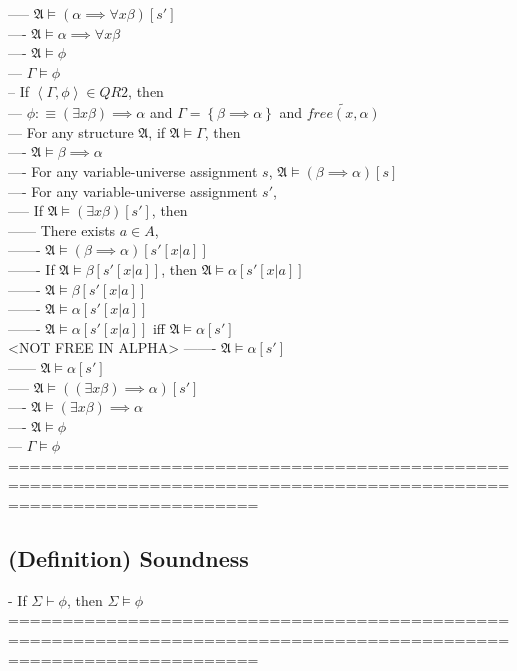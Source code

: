 \documentclass{book}
\newcommand{\is}{:\equiv}
\newcommand{\pnot}[1]{\widetilde{#1}}
\newcommand{\free}[2]{free(#1, #2)}
\newcommand{\set}[1]{\left\{ #1 \right\}}
\newcommand{\seq}[1]{\left\langle #1 \right\rangle}
\begin{document}
					----- $\mathfrak{A} \vDash (\alpha \implies \forall x \beta)[s']$ \\
				---- $\mathfrak{A} \vDash \alpha \implies \forall x \beta$ \\
				---- $\mathfrak{A} \vDash \phi$ \\
			--- $\Gamma \vDash \phi$ \\
		-- If $\seq{\Gamma, \phi} \in QR2$, then \\
			--- $\phi \is (\exists x \beta) \implies \alpha$ and $\Gamma = \set{\beta \implies \alpha}$ and $\pnot{\free{x}{\alpha}}$ \\
			--- For any structure $\mathfrak{A}$, if $\mathfrak{A} \vDash \Gamma$, then \\
				---- $\mathfrak{A} \vDash \beta \implies \alpha$ \\
				---- For any variable-universe assignment $s$, $\mathfrak{A} \vDash (\beta \implies \alpha)[s]$ \\
				---- For any variable-universe assignment $s'$, \\
					----- If $\mathfrak{A} \vDash (\exists x \beta)[s']$, then \\
						------ There exists $a \in A$, \\
							------- $\mathfrak{A} \vDash (\beta \implies \alpha)[s'[x|a]]$ \\
							------- If $\mathfrak{A} \vDash \beta[s'[x|a]]$, then $\mathfrak{A} \vDash \alpha[s'[x|a]]$ \\
							------- $\mathfrak{A} \vDash \beta[s'[x|a]]$ \\
							------- $\mathfrak{A} \vDash \alpha[s'[x|a]]$ \\
							------- $\mathfrak{A} \vDash \alpha[s'[x|a]]$ iff $\mathfrak{A} \vDash \alpha[s']$ \\ <NOT FREE IN ALPHA>
							------- $\mathfrak{A} \vDash \alpha[s']$ \\
						------ $\mathfrak{A} \vDash \alpha[s']$ \\
					----- $\mathfrak{A} \vDash ((\exists x \beta) \implies \alpha)[s']$ \\
				---- $\mathfrak{A} \vDash (\exists x \beta) \implies \alpha$ \\
				---- $\mathfrak{A} \vDash \phi$ \\
			--- $\Gamma \vDash \phi$ \\
	===================================================================================================================
\subsection{(Definition) Soundness} %
	- If $\Sigma \vdash \phi$, then $\Sigma \vDash \phi$ \\
	===================================================================================================================
\end{document}
